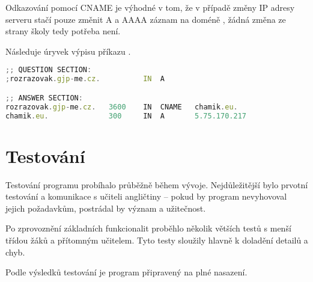 Odkazování pomocí CNAME je výhodné v tom, že v případě změny IP adresy serveru stačí pouze změnit A a AAAA záznam na doméně , žádná změna ze strany školy tedy potřeba není.

Následuje úryvek výpisu příkazu .

\begin{lstlisting}[language=JavaScript,caption={Úryvek výpisu programu dig}]
;; QUESTION SECTION:
;rozrazovak.gjp-me.cz.		    IN	A

;; ANSWER SECTION:
rozrazovak.gjp-me.cz.	3600    IN	CNAME	chamik.eu.
chamik.eu.		        300	    IN	A	    5.75.170.217
\end{lstlisting}

\section{Testování}

Testování programu probíhalo průběžně během vývoje. Nejdůležitější bylo prvotní testování a komunikace s učiteli angličtiny -- pokud by program nevyhovoval jejich požadavkům, postrádal by význam a užitečnost.

Po zprovoznění základních funkcionalit proběhlo několik větších testů s menší třídou žáků a přítomným učitelem. Tyto testy sloužily hlavně k doladění detailů a chyb.

Podle výsledků testování je program připravený na plné nasazení.

